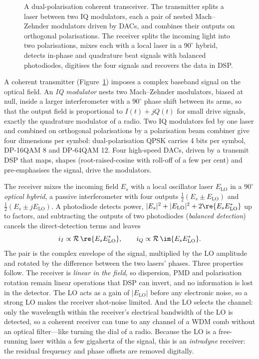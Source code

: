 \begin{figure}[htbp]
\caption{A dual-polarisation coherent transceiver. The transmitter splits a laser between two IQ
modulators, each a pair of nested Mach--Zehnder modulators driven by DACs, and combines their outputs on
orthogonal polarisations. The receiver splits the incoming light into two polarisations, mixes each with a
local laser in a $90^\circ$ hybrid, detects in-phase and quadrature beat signals with balanced
photodiodes, digitises the four signals and recovers the data in DSP.}
\label{fig:ch24_coherent}
\end{figure}

A coherent transmitter (Figure~\ref{fig:ch24_coherent}) imposes a complex baseband signal on the optical
field. An \emph{IQ modulator} nests two Mach--Zehnder modulators, biased at null, inside a larger
interferometer with a $90^\circ$ phase shift between its arms, so that the output field is proportional to
$I(t)+jQ(t)$ for small drive signals, exactly the quadrature modulator of a radio. Two IQ modulators fed by
one laser and combined on orthogonal polarisations by a polarisation beam combiner give four
dimensions per symbol: dual-polarisation QPSK carries 4 bits per symbol, DP-16QAM 8 and DP-64QAM 12.
Four high-speed DACs, driven by a transmit DSP that maps, shapes (root-raised-cosine with roll-off of a
few per cent) and pre-emphasises the signal, drive the modulators.

The receiver mixes the incoming field $E_s$ with a local oscillator laser $E_{\mathrm{LO}}$ in a
$90^\circ$ \emph{optical hybrid}, a passive interferometer with four outputs $\tfrac12(E_s\pm E_{\mathrm{LO}})$
and $\tfrac12(E_s\pm jE_{\mathrm{LO}})$. A photodiode detects power, $|E_s|^2+|E_{\mathrm{LO}}|^2+2\re\{E_sE_{\mathrm{LO}}^*\}$
up to factors, and subtracting the outputs of two photodiodes (\emph{balanced detection}) cancels the
direct-detection terms and leaves
\begin{equation}
i_I\propto\mathcal R\,\re\{E_sE_{\mathrm{LO}}^*\},\qquad i_Q\propto\mathcal R\,\im\{E_sE_{\mathrm{LO}}^*\}.
\end{equation}
The pair is the complex envelope of the signal, multiplied by the LO amplitude and rotated by the
difference between the two lasers' phases. Three properties follow. The receiver is \emph{linear in the
field}, so dispersion, PMD and polarisation rotation remain linear operations that DSP can invert, and
no information is lost in the detector. The LO acts as a gain of $|E_{\mathrm{LO}}|$ before any electronic
noise, so a strong LO makes the receiver shot-noise limited. And the LO selects the channel: only the
wavelength within the receiver's electrical bandwidth of the LO is detected, so a coherent receiver can
tune to any channel of a WDM comb without an optical filter---like turning the dial of a radio. Because
the LO is a free-running laser within a few gigahertz of the signal, this is an \emph{intradyne}
receiver: the residual frequency and phase offsets are removed digitally.

